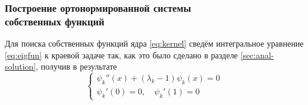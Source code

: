 \documentclass[11pt]{article}
\numberwithin{equation}{section}
\begin{document}
\subsubsection{Построение ортонормированной системы\\
  собственных функций}

Для поиска собственных функций ядра \eqref{eq:kernel} сведём
интегральное уравнение \eqref{eq:eigfun} к краевой задаче так, как это
было сделано в разделе \ref{sec:anal-solution}, получив в результате
\begin{equation}
  \label{eq:eig-boundary}
  \begin{cases}
    \psi_k''(x)+(\lambda_k-1)\psi_k(x)=0 \\
    \psi_k'(0) = 0, \quad \psi_k'(1)=0
  \end{cases}
\end{equation}
\end{document}
